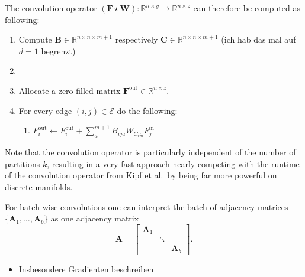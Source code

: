\documentclass[pdftex,10pt,a4paper]{scrartcl}
\begin{document}
The convolution operator $(\mathbf{F} \star \mathbf{W}) \colon \mathbb{R}^{n \times y} \to \mathbb{R}^{n \times z}$ can therefore be computed as following:
\begin{enumerate}
  \item Compute $\mathbf{B} \in \mathbb{R}^{n \times n \times m + 1}$ respectively $\mathbf{C} \in \mathbb{R}^{n \times n \times m + 1}$ (ich hab das mal auf $d = 1$ begrenzt)
  \item
  \item Allocate a zero-filled matrix $\mathbf{F}^{\mathrm{out}} \in \mathbb{R}^{n \times z}$.
  \item For every edge $(i, j) \in \mathcal{E}$ do the following:
  \begin{enumerate}
    \item $F^{\mathrm{out}}_i \leftarrow F^{\mathrm{out}}_i + \sum_a^{m+1} B_{ija} W_{C_{ija}} F^{\mathrm{in}}_j$
  \end{enumerate}
\end{enumerate}
Note that the convolution operator is particularly independent of the number of partitions $k$, resulting in a very fast approach nearly competing with the runtime of the convolution operator from Kipf et al.\ by being far more powerful on discrete manifolds.

For batch-wise convolutions one can interpret the batch of adjacency matrices $\{ \mathbf{A}_1, \ldots, \mathbf{A}_b \}$ as one adjacency matrix
\begin{equation*}
  \mathbf{A} = \begin{bmatrix}
    \mathbf{A}_1 & & \\
    & \ddots &  \\
    & & \mathbf{A}_b
  \end{bmatrix}.
\end{equation*}









\newpage


\begin{itemize}
  \item Insbesondere Gradienten beschreiben
\end{itemize}
\end{document}
